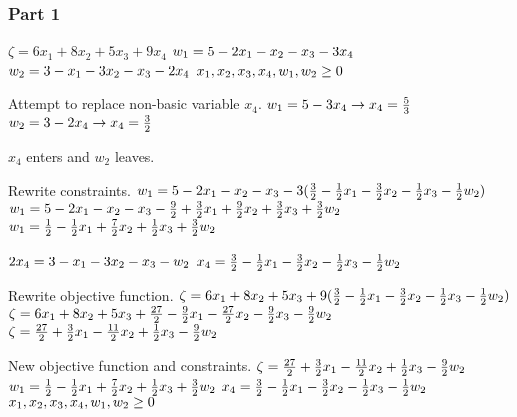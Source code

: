 \documentclass[17pt]{extarticle}
\begin{document}
\subsubsection*{Part 1}
$\zeta = 6x_1 + 8x_2 + 5x_3 + 9x_4$
$\\ w_1 = 5 - 2x_1 - x_2 - x_3 - 3x_4$
$\\ w_2 = 3 - x_1 - 3x_2 - x_3 - 2x_4$
$\\ x_1, x_2, x_3, x_4, w_1, w_2 \geq 0$

\bigskip Attempt to replace non-basic variable $x_4$.
$\\ w_1 = 5 - 3x_4 \to x_4 = \frac{5}{3}$
$\\ w_2 = 3 - 2x_4 \to x_4 = \frac{3}{2}$

\bigskip $x_4$ enters and $w_2$ leaves.

\bigskip Rewrite constraints.
$\\ w_1 = 5 - 2x_1 - x_2 - x_3 - 3(\frac{3}{2} - \frac{1}{2}x_1 - \frac{3}{2}x_2 - \frac{1}{2}x_3 - \frac{1}{2}w_2)$
$\\ w_1 = 5 - 2x_1 - x_2 - x_3 - \frac{9}{2} + \frac{3}{2}x_1 + \frac{9}{2}x_2 + \frac{3}{2}x_3 + \frac{3}{2}w_2$
$\\ w_1 = \frac{1}{2} - \frac{1}{2}x_1 + \frac{7}{2}x_2 + \frac{1}{2}x_3 + \frac{3}{2}w_2$

$\\ 2x_4 = 3 - x_1 - 3x_2 - x_3 - w_2$
$\\ x_4 = \frac{3}{2} - \frac{1}{2}x_1 - \frac{3}{2}x_2 - \frac{1}{2}x_3 - \frac{1}{2}w_2$

\bigskip Rewrite objective function.
$\\\zeta = 6x_1 + 8x_2 + 5x_3 + 9(\frac{3}{2} - \frac{1}{2}x_1 - \frac{3}{2}x_2 - \frac{1}{2}x_3 - \frac{1}{2}w_2)$
$\\\zeta = 6x_1 + 8x_2 + 5x_3 + \frac{27}{2} - \frac{9}{2}x_1 - \frac{27}{2}x_2 - \frac{9}{2}x_3 - \frac{9}{2}w_2$
$\\\zeta = \frac{27}{2} + \frac{3}{2}x_1 - \frac{11}{2}x_2 + \frac{1}{2}x_3 - \frac{9}{2}w_2$

\bigskip New objective function and constraints.
$\\\zeta = \frac{27}{2} + \frac{3}{2}x_1 - \frac{11}{2}x_2 + \frac{1}{2}x_3 - \frac{9}{2}w_2$
$\\ w_1 = \frac{1}{2} - \frac{1}{2}x_1 + \frac{7}{2}x_2 + \frac{1}{2}x_3 + \frac{3}{2}w_2$
$\\ x_4 = \frac{3}{2} - \frac{1}{2}x_1 - \frac{3}{2}x_2 - \frac{1}{2}x_3 - \frac{1}{2}w_2$
$\\ x_1, x_2, x_3, x_4, w_1, w_2 \geq 0$
\end{document}
